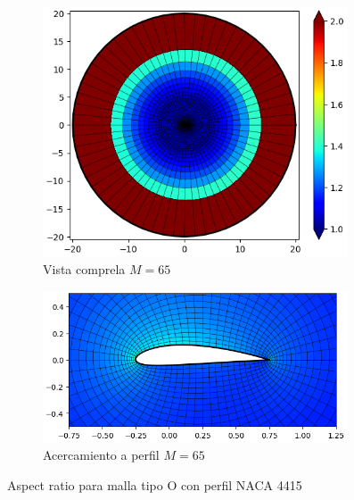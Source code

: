 \documentclass[letterpaper, openright, 12pt]{book}
\begin{document}
\begin{figure}[htbp!]
\begin{subfigure}[c]{0.48\textwidth}
            \includegraphics[keepaspectratio,
                width=0.99\textwidth]{./img/naca4415_m_65_aspect_far}
            \caption{Vista comprela $M=65$}
            \label{fig:naca4415_m_65_aspect_far}
        \end{subfigure}
        \hfill
        \begin{subfigure}[c]{0.48\textwidth}
            \includegraphics[keepaspectratio,
                width=0.99\textwidth]{./img/naca4415_m_65_aspect_close}
            \caption{Acercamiento a perfil $M=65$}
            \label{fig:naca4415_m_65_aspect_close}
        \end{subfigure}
        \caption{Aspect ratio para malla tipo O con perfil NACA 4415}
        \label{fig:naca4415_aspect_0}
    \end{figure}
\end{document}
